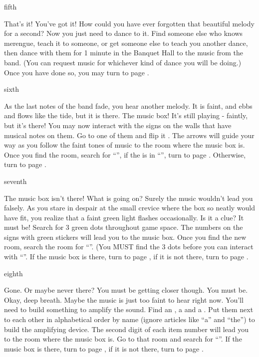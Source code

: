 \documentclass[greennotebook]{NeptuneBall}
\begin{document}
\begin{page}{fifth}

That's it! You've got it! How could you have ever forgotten that beautiful melody for a second? Now you just need to dance to it. Find someone else who knows merengue, teach it to someone, or get someone else to teach you another dance, then dance with them for 1 minute in the Banquet Hall to the music from the band. (You can request music for whichever kind of dance you will be doing.) Once you have done so, you may turn to page .

\end{page}

\begin{page}{sixth}

As the last notes of the band fade, you hear another melody. It is faint, and ebbs and flows like the tide, but it is there. The music box! It's still playing - faintly, but it's there! You may now interact with the signs on the walls that have musical notes on them. Go to one of them and flip it \emph{\up}. The arrows will guide your way as you follow the faint tones of music to the room where the music box is. Once you find the room, search for ``\sPacketA{}'', if the \iMusicBox{} is in ``\sPacketA{}'', turn to page . Otherwise, turn to page .

\end{page}

\begin{page}{seventh}

The music box isn't there! What is going on? Surely the music wouldn't lead you falsely. As you stare in despair at the small crevice where the box so neatly would have fit, you realize that a faint green light flashes occasionally. Is it a clue? It must be!  Search for 3 green dots throughout game space. The numbers on the signs with green stickers will lead you to the music box. Once you find the new room, search the room for ``\sPacketB{}''. (You MUST find the 3 dots before you can interact with ``\SPacketB{}''. If the music box is there, turn to page , if it is not there, turn to page .

\end{page}

\begin{page}{eighth}

Gone. Or maybe never there? You must be getting closer though. You must be. Okay, deep breath. Maybe the music is just too faint to hear right now. You'll need to build something to amplify the sound. Find an \iConch{}, a \iPaper{} and a \iClam{}. Put them next to each other in alphabetical order by name (ignore articles like ``a'' and ``the'') to build the amplifying device. The second digit of each item number will lead you to the room where the music box is. Go to that room and search for ``\sPacketC{}''. If the music box is there, turn to page , if it is not there, turn to page .

\end{page}
\end{document}
